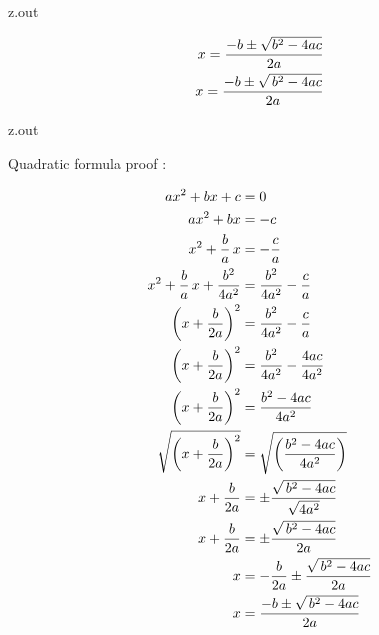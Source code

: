 \MyIO


\begin{VerbatimOut}{z.out}

\begin{align}
  x = \frac{-b \pm \sqrt{b^2-4ac}}{2a}\notag\\
  x = \frac{-b \pm \sqrt{\,b^2-4ac}}{2a}
\end{align}
\end{VerbatimOut}
\index{\verb+\begin{align}+}
\index{\verb+\,+}

\MyIO


\begin{VerbatimOut}{z.out}

Quadratic formula proof \cite{khan}:

\begin{align}
  ax^2 + bx + c &= 0\\
  ax^2 + bx &= -c\notag\\
  x^2 + \frac ba\,x &= -\frac ca\notag\\
  x^2 + \frac ba\,x + \frac{b^2}{4a^2} &= \frac{b^2}{4a^2} - \frac ca\notag\\
  \left(x + \frac b{2a}\right)^2 &= \frac{b^2}{4a^2} - \frac ca\notag\\
  \left(x + \frac b{2a}\right)^2 &= \frac{b^2}{4a^2} - \frac{4ac}{4a^2}\notag\\
  \left(x + \frac b{2a}\right)^2 &= \frac{b^2-4ac}{4a^2}\notag\\
  \sqrt{\left(x + \frac b{2a}\right)^2}
    &= \sqrt{\left(\frac{b^2-4ac}{4a^2}\right)}\notag\\
  x + \frac b{2a} &= \pm \frac{\sqrt{\,b^2-4ac}}{\sqrt{4a^2}}\notag\\
  x + \frac b{2a} &= \pm \frac{\sqrt{\,b^2-4ac}}{2a}\notag\\
  x &= - \frac b{2a} \pm \frac{\sqrt{\,b^2-4ac}}{2a}\notag\\
  x &= \frac{-b \pm \sqrt{\,b^2-4ac}}{2a}
\end{align}
\end{VerbatimOut}

\MyIO


